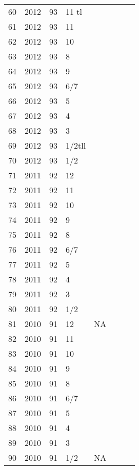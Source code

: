 \begin{longtable}{ |l|l|l|l|l|l|l|l| }
 60 & 2012 & 93 & 11 tl &         &  &  & \\
 61 & 2012 & 93 & 11    &         &  &  & \\
 62 & 2012 & 93 & 10    &         &  &   & \\
 63 & 2012 & 93 & 8     &         &  &  & \\
 64 & 2012 & 93 & 9     &         &  &  & \\
 65 & 2012 & 93 &   6/7 &         &  &  & \\
 66 & 2012 & 93 &     5 &         &  &  & \\
 67 & 2012 & 93 &     4 &         &  &  & \\
 68 & 2012 & 93 &     3 &         &  &  & \\
 69 & 2012 & 93 & 1/2tll&         &  &  & \\
 70 & 2012 & 93 &   1/2 &         &  &  & \\
 71 & 2011 & 92 &    12 &         &  &  & \\
 72 & 2011 & 92 &    11 &         &  &  & \\
 73 & 2011 & 92 &    10 &         &  &  & \\
 74 & 2011 & 92 &     9 &         &  &  & \\
 75 & 2011 & 92 &     8 &         &  &  & \\
 76 & 2011 & 92 &   6/7 &         &  &  & \\
 77 & 2011 & 92 &     5 &         &  &  & \\
 78 & 2011 & 92 &     4 &         &  &  & \\
 79 & 2011 & 92 &     3 &         &  &  & \\
 80 & 2011 & 92 &   1/2 &         &  &  & \\
 81 & 2010 & 91 &   12  &      NA &  &  & \\
 82 & 2010 & 91 &    11 &         &  &  & \\
 83 & 2010 & 91 &    10 &         &  &  & \\
 84 & 2010 & 91 &     9 &         &  &  & \\
 85 & 2010 & 91 &     8 &         &  &  & \\
 86 & 2010 & 91 &   6/7 &         &  &  & \\
 87 & 2010 & 91 &     5 &         &  &  & \\
 88 & 2010 & 91 &     4 &         &  &  & \\
 89 & 2010 & 91 &     3 &         &  &  & \\
 90 & 2010 & 91 &   1/2 &      NA &  &  & \\

\end{longtable}
